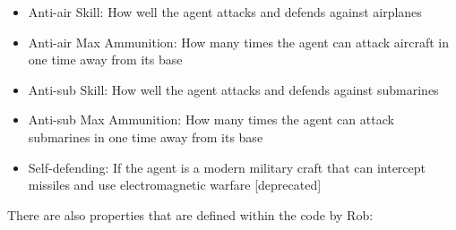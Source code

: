 \documentclass{article}
\begin{document}
\begin{itemize}
    \item Anti-air Skill: How well the agent attacks and defends against airplanes
    \item Anti-air Max Ammunition: How many times the agent can attack aircraft in one time away from its base
    \item Anti-sub Skill: How well the agent attacks and defends against submarines
    \item Anti-sub Max Ammunition: How many times the agent can attack submarines in one time away from its base
    \item Self-defending: If the agent is a modern military craft that can intercept missiles and use electromagnetic warfare [deprecated]
\end{itemize}

There are also properties that are defined within the code by Rob:
\end{document}
